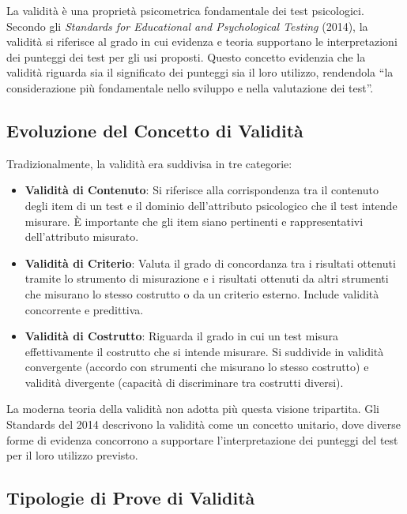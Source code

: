 \documentclass[
  letterpaper,
  DIV=11,
  numbers=noendperiod]{scrreprt}
\providecommand{\tightlist}{%
  \setlength{\itemsep}{0pt}\setlength{\parskip}{0pt}}\usepackage{longtable,booktabs,array}
\theoremstyle{definition}
\theoremstyle{remark}
\begin{document}
La validità è una proprietà psicometrica fondamentale dei test
psicologici. Secondo gli \emph{Standards for Educational and
Psychological Testing} (2014), la validità si riferisce al grado in cui
evidenza e teoria supportano le interpretazioni dei punteggi dei test
per gli usi proposti. Questo concetto evidenzia che la validità riguarda
sia il significato dei punteggi sia il loro utilizzo, rendendola ``la
considerazione più fondamentale nello sviluppo e nella valutazione dei
test''.

\subsection{Evoluzione del Concetto di
Validità}\label{evoluzione-del-concetto-di-validituxe0}

Tradizionalmente, la validità era suddivisa in tre categorie:

\begin{itemize}
\tightlist
\item
  \textbf{Validità di Contenuto}: Si riferisce alla corrispondenza tra
  il contenuto degli item di un test e il dominio dell'attributo
  psicologico che il test intende misurare. È importante che gli item
  siano pertinenti e rappresentativi dell'attributo misurato.
\item
  \textbf{Validità di Criterio}: Valuta il grado di concordanza tra i
  risultati ottenuti tramite lo strumento di misurazione e i risultati
  ottenuti da altri strumenti che misurano lo stesso costrutto o da un
  criterio esterno. Include validità concorrente e predittiva.
\item
  \textbf{Validità di Costrutto}: Riguarda il grado in cui un test
  misura effettivamente il costrutto che si intende misurare. Si
  suddivide in validità convergente (accordo con strumenti che misurano
  lo stesso costrutto) e validità divergente (capacità di discriminare
  tra costrutti diversi).
\end{itemize}

La moderna teoria della validità non adotta più questa visione
tripartita. Gli Standards del 2014 descrivono la validità come un
concetto unitario, dove diverse forme di evidenza concorrono a
supportare l'interpretazione dei punteggi del test per il loro utilizzo
previsto.

\subsection{Tipologie di Prove di
Validità}\label{tipologie-di-prove-di-validituxe0}
\end{document}
